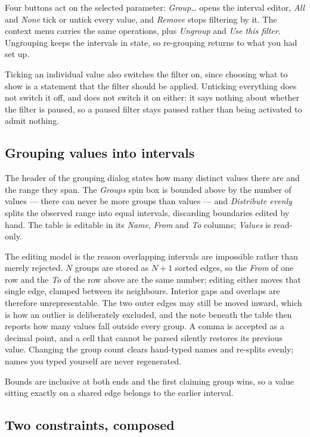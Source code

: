 \documentclass[11pt,a4paper,oneside]{report}
\begin{document}
Four buttons act on the selected parameter: \emph{Group\ldots} opens the interval
editor, \emph{All} and \emph{None} tick or untick every value, and \emph{Remove}
stops filtering by it. The context menu carries the same operations, plus
\emph{Ungroup} and \emph{Use this filter}. Ungrouping keeps the intervals in
state, so re-grouping returns to what you had set up.

Ticking an individual value also switches the filter on, since choosing what to
show is a statement that the filter should be applied. Unticking everything does
not switch it off, and does not switch it on either: it says nothing about
whether the filter is paused, so a paused filter stays paused rather than being
activated to admit nothing.

\subsection{Grouping values into intervals}

The header of the grouping dialog states how many distinct values there are and
the range they span. The \emph{Groups} spin box is bounded above by the number of
values --- there can never be more groups than values --- and \emph{Distribute
evenly} splits the observed range into equal intervals, discarding boundaries
edited by hand. The table is editable in its \emph{Name}, \emph{From} and
\emph{To} columns; \emph{Values} is read-only.

The editing model is the reason overlapping intervals are impossible rather than
merely rejected. $N$ groups are stored as $N+1$ sorted edges, so the \emph{From}
of one row and the \emph{To} of the row above are the same number; editing either
moves that single edge, clamped between its neighbours. Interior gaps and
overlaps are therefore unrepresentable. The two outer edges may still be moved
inward, which is how an outlier is deliberately excluded, and the note beneath
the table then reports how many values fall outside every group. A comma is
accepted as a decimal point, and a cell that cannot be parsed silently restores
its previous value. Changing the group count clears hand-typed names and
re-splits evenly; names you typed yourself are never regenerated.

Bounds are inclusive at both ends and the first claiming group wins, so a value
sitting exactly on a shared edge belongs to the earlier interval.

\subsection{Two constraints, composed}
\end{document}
